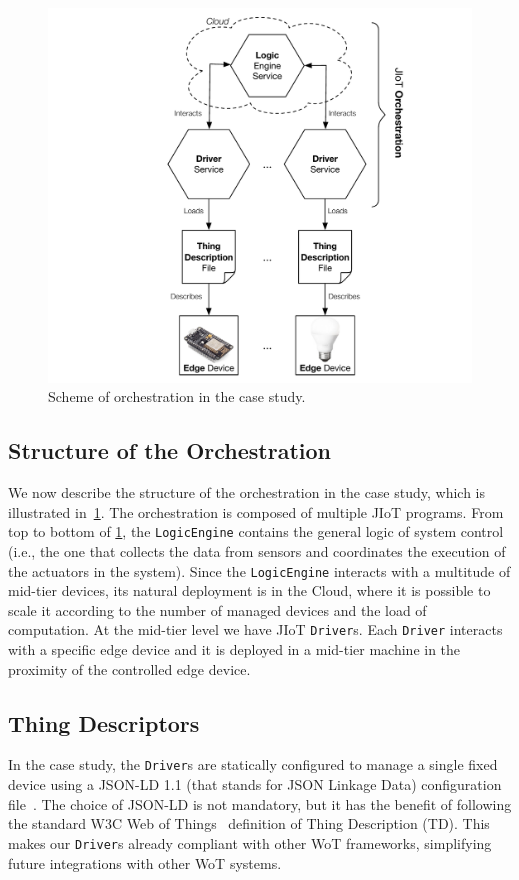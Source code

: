 \begin{figure}[b]
  \centering
  \includegraphics[width=.8\textwidth]{case_study_abstraction.pdf}
  \caption{Scheme of orchestration in the case study.}
  \label{fig:case_study_abstraction}
\end{figure}

\subsection{Structure of the Orchestration}

We now describe the structure of the orchestration in the case study, which is
illustrated in~\cref{fig:case_study_abstraction}.
%
The orchestration is composed of multiple JIoT programs. From top to bottom of
\cref{fig:case_study_abstraction}, the \texttt{LogicEngine} contains the general
logic of system control (i.e., the one that collects the data from sensors and
coordinates the execution of the actuators in the system). Since the
\texttt{LogicEngine} interacts with a multitude of mid-tier devices, its
natural deployment is in the Cloud, where it is possible to scale it according
to the number of managed devices and the load of computation. At the mid-tier
level we have JIoT \texttt{Driver}s. Each \texttt{Driver} interacts with a
specific edge device and it is deployed in a mid-tier machine in the proximity
of the controlled edge device.

\subsection{Thing Descriptors}

In the case study, the \texttt{Driver}s are statically configured to manage a
single fixed device using a JSON-LD 1.1 (that stands for JSON Linkage Data)
configuration file~\cite{jsonld}. The choice of JSON-LD is not mandatory, but
it has the benefit of following the standard W3C Web of Things~\cite{w3c17}
definition of Thing Description (TD). This makes our \texttt{Driver}s already
compliant with other WoT frameworks, simplifying future integrations with
other WoT systems.

